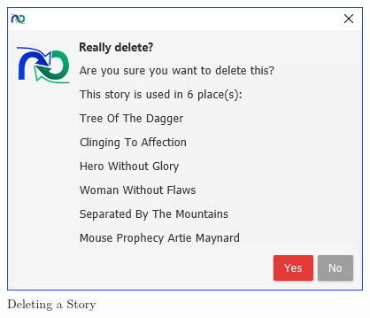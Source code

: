 \begin{figure}[H]
\centering
\includegraphics[width=\textwidth]{images/screenshots/stories5.PNG}
\caption{Deleting a Story}
\label{fig:new_project}
\end{figure}